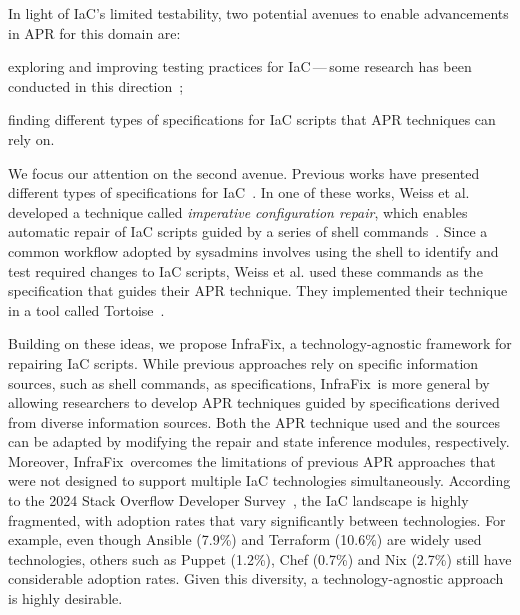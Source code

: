 \documentclass[sigconf,nonacm]{acmart}
\def\name{{\sc InfraFix}}
\begin{document}
In light of IaC's limited testability, two potential avenues to enable advancements in APR for this domain are:
\begin{enumerate*}
\item exploring and improving testing practices for IaC\,---\,some research has been conducted in this direction~\cite{hasan2020testing,sokolowski2024automated,sokolowski2024pipr};
\item finding different types of specifications for IaC scripts that APR techniques can rely on. 
\end{enumerate*}
We focus our attention on the second avenue. Previous works have presented different types of specifications for IaC~\cite{hassan2018rudsea,weiss2017tortoise}. In one of these works, Weiss et al. developed a technique called \emph{imperative configuration repair}, which enables automatic repair of IaC scripts guided by a series of shell commands~\cite{weiss2017tortoise}. Since a common workflow adopted by sysadmins involves using the shell to identify and test required changes to IaC scripts, Weiss et al. used these commands as the specification that guides their APR technique. They implemented their technique in a tool called Tortoise~\cite{weiss2017tortoise}.

Building on these ideas, we propose \name, a technology-agnostic framework for repairing IaC scripts. While previous approaches rely on specific information sources, such as shell commands, as specifications, \name\ is more general by allowing researchers to develop APR techniques guided by specifications derived from diverse information sources. Both the APR technique used and the sources can be adapted by modifying the repair and state inference modules, respectively. 
Moreover, \name\ overcomes the limitations of previous APR approaches that were not designed to support multiple IaC technologies simultaneously. According to the 2024 Stack Overflow Developer Survey~\cite{Overflow_2024}, the IaC landscape is highly fragmented, with adoption rates that vary significantly between technologies. For example, even though Ansible (7.9\%) and Terraform (10.6\%) are widely used technologies, others such as Puppet (1.2\%), Chef (0.7\%) and Nix (2.7\%) still have considerable adoption rates. Given this diversity, a technology-agnostic approach is highly desirable.
\end{document}
